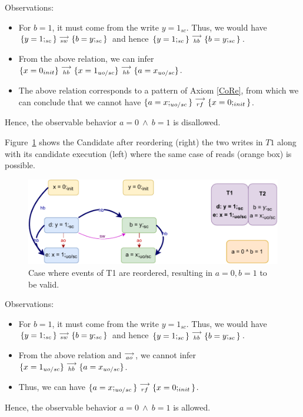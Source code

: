         Observations:
        \begin{itemize}
            \item For $b=1$, it must come from the write $y=1_{sc}$. 
            Thus, we would have $\{y=1;_{sc}\}\stackrel{\longrightarrow}{_{sw}}\{b=y;_{sc}\}$ and hence $\{y=1;_{sc}\}\stackrel{\longrightarrow}{_{hb}}\{b=y;_{sc}\}$.
            \item From the above relation, we can infer $\{x=0_{init}\}\stackrel{\longrightarrow}{_{hb}}\{x=1_{uo/sc}\}\stackrel{\longrightarrow}{_{hb}}\{a=x_{uo/sc}\}$.
            \item The above relation corresponds to a pattern of Axiom \ref{CoRe}, from which we can conclude that we cannot have $\{a=x;_{uo/sc}\}\stackrel{\longrightarrow}{_{rf}}\{x=0;_{init}\}$.
        \end{itemize}
        Hence, the observable behavior $a=0 \ \wedge \ b=1$ is disallowed.

        Figure~\ref{reord_counter:example4(b)} shows the Candidate after reordering (right) the two writes in $T1$ along with its candidate execution (left) where the same case of reads (orange box) is possible. 
        \begin{figure}[H]
            \centering
            \includegraphics[scale=0.7]{7.CounterExamples/ReorderingCandidate/Example7R(Wuo,sc-Wsc).pdf}
            \caption{Case where events of T1 are reordered, resulting in $a = 0,  b = 1$ to be valid.}
            \label{reord_counter:example4(b)}
        \end{figure}
        
        Observations:
        \begin{itemize}
            \item For $b=1$, it must come from the write $y=1_{sc}$. 
            Thus, we would have $\{y=1;_{sc}\}\stackrel{\longrightarrow}{_{sw}}\{b=y;_{sc}\}$ and hence $\{y=1;_{sc}\}\stackrel{\longrightarrow}{_{hb}}\{b=y;_{sc}\}$.
            \item From the above relation and $\stackrel{\longrightarrow}{_{ao}}$, we cannot infer $\{x=1_{uo/sc}\}\stackrel{\longrightarrow}{_{hb}}\{a=x_{uo/sc}\}$.
            \item Thus, we can have  $\{a=x;_{uo/sc}\}\stackrel{\longrightarrow}{_{rf}}\{x=0;_{init}\}$.
        \end{itemize}
        Hence, the observable behavior $a=0 \ \wedge \ b=1$ is allowed.